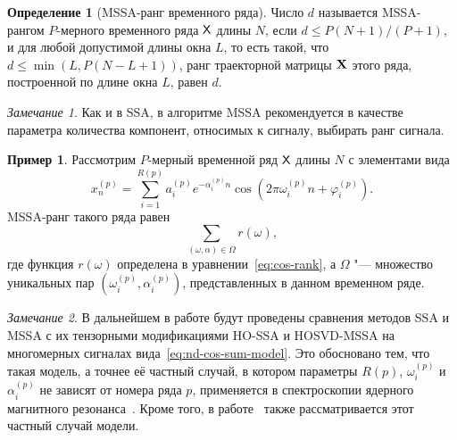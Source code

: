 \documentclass[specialist,
    substylefile = spbu.rtx,
    subf,href,colorlinks=true, 12pt]{disser}
\theoremstyle{plain}
\theoremstyle{definition}
\newtheorem{definition}{Определение}[section]
\newtheorem{example}{Пример}[section]
\theoremstyle{remark}
\newtheorem*{remark}{Замечание}
\begin{document}
    \begin{definition}[MSSA-ранг временного ряда]
        \label{def:mssa-rank}
        Число $d$ называется MSSA-рангом $P$-мерного временного ряда $\mathsf{X}$ длины $N$, если $d \leqslant P(N+1) / (P+1)$,
        и для любой допустимой
        длины окна $L$,
        то есть такой, что $d \leqslant \min(L, P(N- L + 1))$, ранг траекторной матрицы $\mathbf{X}$ этого ряда,
        построенной по длине окна $L$, равен $d$.
    \end{definition}
    \begin{remark}
        Как и в SSA, в алгоритме MSSA рекомендуется в качестве параметра количества компонент, относимых к сигналу,
        выбирать ранг сигнала.
    \end{remark}
    \begin{example}
        \label{ex:mssa-ranks}
        Рассмотрим $P$-мерный временной ряд $\mathsf{X}$ длины $N$ с элементами вида
        \begin{equation}
            \label{eq:nd-cos-sum-model}
            x_n^{(p)} = \sum_{i=1}^{R(p)} a_i^{(p)} e^{-\alpha_i^{(p)} n}
            \cos\left(2 \pi \omega_i^{(p)} n + \varphi_i^{(p)}\right).
        \end{equation}
        MSSA-ранг такого ряда равен
        \begin{equation}
            \sum_{(\omega, \alpha)\in \Omega} r(\omega),
        \end{equation}
        где функция $r(\omega)$ определена в уравнении~\eqref{eq:cos-rank}, а $\Omega$ "--- множество уникальных пар
        \linebreak $\left(\omega_i^{(p)}, \alpha_i^{(p)}\right)$, представленных в данном временном ряде.
    \end{example}

    \begin{remark}
        В дальнейшем в работе будут проведены сравнения методов SSA и MSSA с их тензорными модификациями
        HO-SSA и HOSVD-MSSA на многомерных сигналах вида~\eqref{eq:nd-cos-sum-model}.
        Это обосновано тем, что такая модель, а точнее её частный случай, в котором параметры $R(p)$, $\omega_i^{(p)}$
        и $\alpha_i^{(p)}$ не зависят от номера ряда $p$, применяется в спектроскопии ядерного магнитного
        резонанса~\cite{NMR}.
        Кроме того, в работе~\cite{hosvd-hooi-separation} также рассматривается этот частный случай модели.
    \end{remark}
\end{document}
